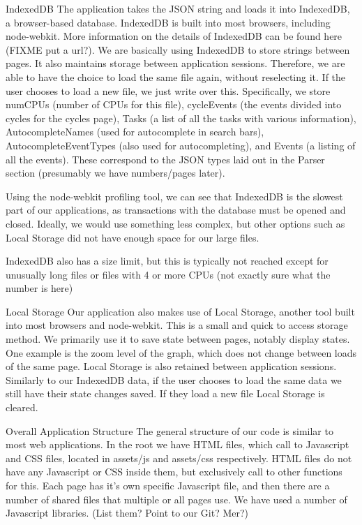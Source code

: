 \documentclass[midyear]{hmcclinic}
\begin{document}
  IndexedDB
  The application takes the JSON string and loads it into IndexedDB, a browser-based database. IndexedDB is built into most browsers, including node-webkit. More information on the details of IndexedDB can be found here (FIXME put a url?). We are basically using IndexedDB to store strings between pages. It also maintains storage between application sessions. Therefore, we are able to have the choice to load the same file again, without reselecting it. If the user chooses to load a new file, we just write over this. Specifically, we store numCPUs (number of CPUs for this file), cycleEvents (the events divided into cycles for the cycles page), Tasks (a list of all the tasks with various information), AutocompleteNames (used for autocomplete in search bars), AutocompleteEventTypes (also used for autocompleting), and Events (a listing of all the events). These correspond to the JSON types laid out in the Parser section (presumably we have numbers/pages later).

  Using the node-webkit profiling tool, we can see that IndexedDB is the slowest part of our applications, as transactions with the database must be opened and closed. Ideally, we would use something less complex, but other options such as Local Storage did not have enough space for our large files.

  IndexedDB also has  a size limit, but this is typically not reached except for unusually long files or files with 4 or more CPUs (not exactly sure what the number is here)

  Local Storage
  Our application also makes use of Local Storage, another tool built into most browsers and node-webkit. This is a small and quick to access storage method. We primarily use it to save state between pages, notably display states. One example is the zoom level of the graph, which does not change between loads of the same page. Local Storage is also retained between application sessions. Similarly to our IndexedDB data, if the user chooses to load the same data we still have their state changes saved. If they load a new file Local Storage is cleared.

  Overall Application Structure 
  The general structure of our code is similar to most web applications. In the root we have HTML files, which call to Javascript and CSS files, located in assets/js and assets/css respectively. HTML files do not have any Javascript or CSS inside them, but exclusively call to other functions for this. Each page has it’s own specific Javascript file, and then there are a number of shared files that multiple or all pages use. We have used a number of Javascript libraries. (List them? Point to our Git? Mer?)
\end{document}
